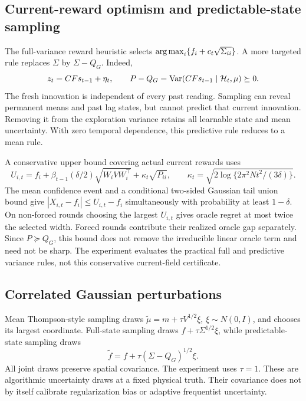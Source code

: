 \subsection{Current-reward optimism and predictable-state sampling}
The full-variance reward heuristic selects $\operatorname*{arg\,max}_i\{f_i+c_t\sqrt{\Sigma_{ii}}\}$. A more targeted rule replaces $\Sigma$ by $\Sigma-Q_G$. Indeed,
\[
z_t=CFs_{t-1}+\eta_t,\qquad
P-Q_G=\operatorname{Var}(CFs_{t-1}\mid\mathcal H_t,\mu)\succeq0.
\]
The fresh innovation is independent of every past reading. Sampling can reveal permanent means and past lag states, but cannot predict that current innovation. Removing it from the exploration variance retains all learnable state and mean uncertainty. With zero temporal dependence, this predictive rule reduces to a mean rule.

A conservative upper bound covering actual current rewards uses
\begin{equation}
U_{i,t}=f_i+\beta_{t-1}(\delta/2)\sqrt{W_iVW_i^\top}
+\kappa_t\sqrt{P_{ii}},\qquad
\kappa_t=\sqrt{2\log\{2\pi^2Nt^2/(3\delta)\}}.
\end{equation}
The mean confidence event and a conditional two-sided Gaussian tail union bound give $|X_{i,t}-f_i|\le U_{i,t}-f_i$ simultaneously with probability at least $1-\delta$. On non-forced rounds choosing the largest $U_{i,t}$ gives oracle regret at most twice the selected width. Forced rounds contribute their realized oracle gap separately. Since $P\succeq Q_G$, this bound does not remove the irreducible linear oracle term and need not be sharp. The experiment evaluates the practical full and predictive variance rules, not this conservative current-field certificate.

\subsection{Correlated Gaussian perturbations}
Mean Thompson-style sampling draws $\widetilde\mu=m+\tau V^{1/2}\xi$, $\xi\sim N(0,I)$, and chooses its largest coordinate. Full-state sampling draws $f+\tau \Sigma^{1/2}\xi$, while predictable-state sampling draws
\begin{equation}
\widetilde f=f+\tau(\Sigma-Q_G)^{1/2}\xi.
\end{equation}
All joint draws preserve spatial covariance. The experiment uses $\tau=1$. These are algorithmic uncertainty draws at a fixed physical truth. Their covariance does not by itself calibrate regularization bias or adaptive frequentist uncertainty.

